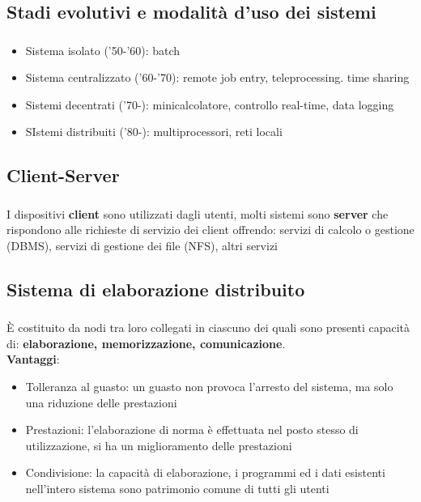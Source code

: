 \documentclass{beamer}
\newenvironment{mainframe}{
	\begin{frame}
		\frametitle{\insertsubsection}
		\framesubtitle{\insertsection}
	}{
	\end{frame}
}
\begin{document}
\subsection{Stadi evolutivi  e modalità d'uso dei sistemi}
\begin{mainframe}
	\begin{itemize}
		\item Sistema isolato ('50-'60): batch
		\item Sistema centralizzato ('60-'70): remote job entry, teleprocessing. time sharing
		\item Sistemi decentrati ('70-): minicalcolatore, controllo real-time, data logging
		\item SIstemi distribuiti ('80-): multiprocessori, reti locali
	\end{itemize}
\end{mainframe}
\subsection{Client-Server}
\begin{mainframe}
	I dispositivi \textbf{client} sono utilizzati dagli utenti, molti sistemi sono \textbf{server} che rispondono alle richieste di servizio dei client offrendo: servizi di calcolo o gestione (DBMS), servizi di gestione dei file (NFS), altri servizi
\end{mainframe}
\subsection{Sistema di elaborazione distribuito}
\begin{mainframe}
	È costituito da nodi tra loro collegati in ciascuno dei quali sono presenti capacità di: \textbf{elaborazione, memorizzazione, comunicazione}.\\
	\textbf{Vantaggi}:
	\begin{itemize}
		\item Tolleranza al guasto: un guasto non provoca l'arresto del sistema, ma solo una riduzione delle prestazioni
		\item Prestazioni: l'elaborazione di norma è effettuata nel posto stesso di utilizzazione, si ha un miglioramento delle prestazioni
		\item Condivisione: la capacità di elaborazione, i programmi ed i dati esistenti nell'intero sistema sono patrimonio comune di tutti gli utenti
	\end{itemize}
\end{mainframe}
\end{document}
